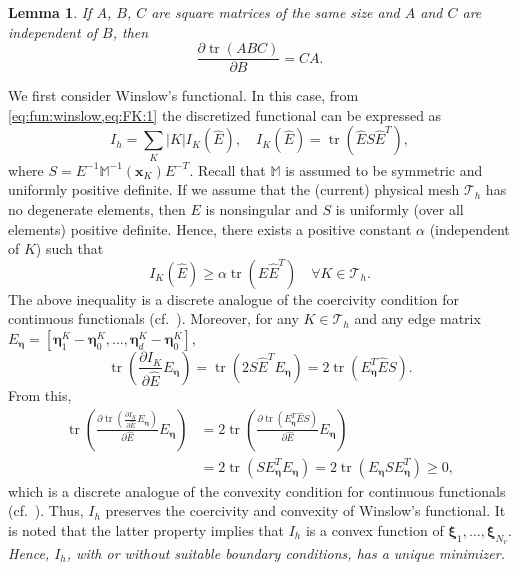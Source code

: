 \documentclass[american]{scrartcl}
\providecommand{\abs}[1]{\lvert#1\rvert}
\providecommand{\V}[1]{\boldsymbol{#1}}
\providecommand{\p}[2]{\frac{\partial{}#1}{\partial{}#2}}
\providecommand{\Th}{\mathcal{T}_h}
\providecommand{\M}{\mathbb{M}}
\newtheorem{lemma}{\hspace{1ex}Lemma}[section]
\theoremstyle{remark}
\begin{document}
\begin{lemma}
\label{lem:tr}
If $A$, $B$, $C$ are square matrices of the same size and $A$ and $C$ are independent of $B$, then
\begin{equation}
\p{\operatorname{tr}(ABC)}{B} = C A .
\label{eq:diff:10}
\end{equation}
\end{lemma}

We first consider Winslow's functional.
In this case, from \cref{eq:fun:winslow,eq:FK:1} the discretized functional can be expressed as
\begin{equation}
   I_h = \sum_{K} \abs{K} I_K(\hat{E}), \quad I_K(\hat{E}) = \operatorname{tr}(\hat{E} S \hat{E}^T)
   ,
   \label{eq:winslow:3}
\end{equation}
where $S = E^{-1} \M^{-1}(\V{x}_K) E^{-T}$. 
Recall that $\M$ is assumed to be symmetric and uniformly positive definite.
If we assume that the (current) physical mesh $\Th$ has no degenerate elements, then $E$ is nonsingular and $S$ is uniformly (over all elements) positive definite.
Hence, there exists a positive constant $\alpha$ (independent of $K$) such that
\begin{equation}
   I_K(\hat{E}) \ge \alpha \operatorname{tr}(\hat{E} \hat{E}^T) \quad \forall K \in \Th
   .
   \label{eq:winslow:4}
\end{equation}
The above inequality is a discrete analogue of the coercivity condition for continuous functionals (cf.~\cite[(6.52)]{HR11}).
Moreover, for any $K\in \Th$ and any edge matrix
$E_{\V{\eta}} = [\V{\eta}_{1}^K-\V{\eta}_{0}^K, \dotsc, \V{\eta}_{d}^K-\V{\eta}_{0}^K]$, 
\[
   \operatorname{tr}\left(\p{I_K}{\hat{E}} E_{\V{\eta}}\right) 
      = \operatorname{tr}\left(2 S \hat{E}^T E_{\V{\eta}}\right)
      =  2 \operatorname{tr}\left(E_{\V{\eta}}^T \hat{E} S \right)
   .
\]
From this,
\begin{align*}
   \operatorname{tr}\left( \p{\operatorname{tr}\left(\p{I_K}{\hat{E}} E_{\V{\eta}}\right)}{\hat{E}} E_{\V{\eta}}\right) 
   &= 2 \operatorname{tr}\left( \p{\operatorname{tr}\left(E_{\V{\eta}}^T \hat{E} S \right)}{\hat{E}}   E_{\V{\eta}}\right) 
   \\ 
   &= 2 \operatorname{tr}\left( S  E_{\V{\eta}}^T  E_{\V{\eta}}\right) 
   = 2 \operatorname{tr}\left( E_{\V{\eta}} S  E_{\V{\eta}}^T  \right)  \ge 0
   ,
\end{align*}
which is a discrete analogue of the convexity condition for continuous functionals (cf.~\cite[(6.53)]{HR11}).
Thus, $I_h$ preserves the coercivity and convexity of Winslow's functional.
It is noted that the latter property implies that $I_h$ is a convex function of $\V{\xi}_{1}, \dotsc, \V{\xi}_{N_v}$.
\emph{Hence, $I_h$, with or without suitable boundary conditions, has a unique minimizer.}
\end{document}
